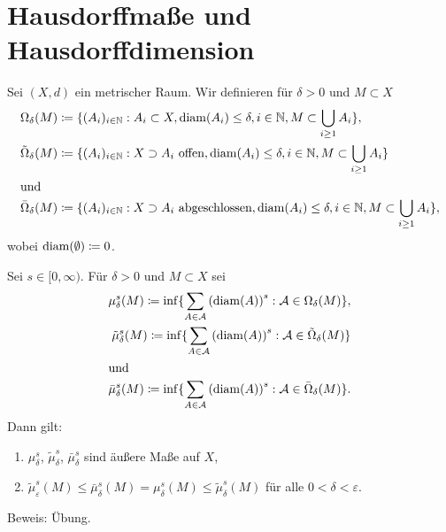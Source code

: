 \documentclass[a4paper,twoside,DIV15,BCOR12mm]{scrbook}
\DeclareMathOperator{\diam}{diam}
\begin{document}
\section{Hausdorffmaße und Hausdorffdimension}

\begin{definition}
Sei \((X,d)\) ein metrischer Raum. Wir definieren für \(\delta > 0\) und \(M \subset X\)
\begin{align*}
& \Omega_\delta(M) \da \{ (A_i)_{i\in\MdN} : A_i \subset X, \diam(A_i) \leq \delta, i\in \MdN, M \subset \bigcup_{i\geq 1} A_i \}, \\
& \tilde\Omega_\delta(M) \da \{ (A_i)_{i\in\MdN} : X \supset A_i \text{ offen}, \diam(A_i) \leq \delta, i\in \MdN, M \subset \bigcup_{i\geq 1} A_i \} \\
\intertext{und}
& \bar\Omega_\delta(M) \da \{ (A_i)_{i\in\MdN} : X \supset A_i \text{ abgeschlossen}, \diam(A_i) \leq \delta, i\in \MdN, M \subset \bigcup_{i\geq 1} A_i \},
\end{align*}
wobei \(\diam(\emptyset) \da 0\).
\end{definition}

\begin{lemma}
\label{lem:2.19}

Sei \(s\in [0,\infty)\). Für \(\delta>0\) und \(M \subset X\) sei
\begin{align*}
\mu_\delta^s (M) \da \inf\{ \sum_{A \in \mathcal{A}}{(\diam(A))}^s : \mathcal{A} \in \Omega_\delta(M) \}, \\
\tilde\mu_\delta^s (M) \da \inf\{ \sum_{A \in \mathcal{A}}{(\diam(A))}^s : \mathcal{A} \in \tilde\Omega_\delta(M) \} \\
\intertext{und}
\bar\mu_\delta^s (M) \da \inf\{ \sum_{A \in \mathcal{A}}{(\diam(A))}^s : \mathcal{A} \in \bar\Omega_\delta(M) \}.
\end{align*}
Dann gilt:
\begin{enumerate}[(1)]
\item \(\mu_\delta^s\), \(\tilde\mu_\delta^s\), \(\bar\mu_\delta^s\) sind äußere Maße auf \(X\),
\item \(\tilde\mu_\varepsilon^s(M) \leq \bar\mu_\delta^s(M) = \mu_\delta^s(M) \leq \tilde\mu_\delta^s(M)\) für alle \(0 < \delta < \varepsilon\).
\end{enumerate}

\end{lemma}
Beweis: Übung.
\end{document}
